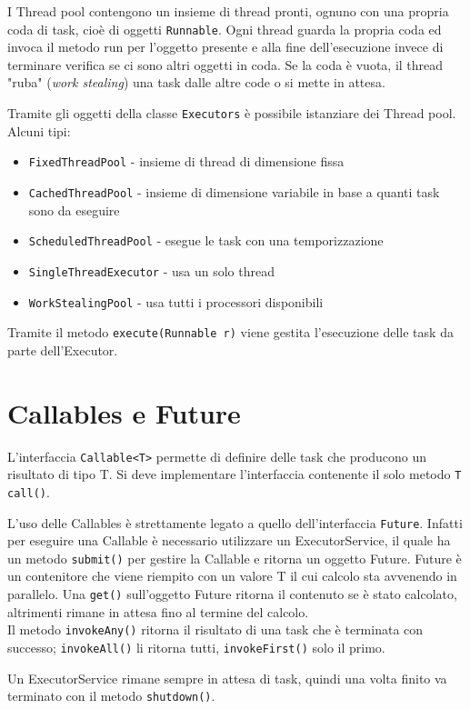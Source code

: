 I Thread pool contengono un insieme di thread pronti, ognuno con una propria coda di task, cioè di oggetti \texttt{Runnable}. Ogni thread guarda la propria coda ed invoca il metodo run per l'oggetto presente e alla fine dell'esecuzione invece di terminare verifica se ci sono altri oggetti in coda. Se la coda è vuota, il thread "ruba" (\textit{work stealing}) una task dalle altre code o si mette in attesa.

Tramite gli oggetti della classe \texttt{Executors} è possibile istanziare dei Thread pool. Alcuni tipi:
\begin{itemize}
\item \texttt{FixedThreadPool} - insieme di thread di dimensione fissa
\item \texttt{CachedThreadPool} - insieme di dimensione variabile in base a quanti task sono da eseguire
\item \texttt{ScheduledThreadPool} - esegue le task con una temporizzazione
\item \texttt{SingleThreadExecutor} - usa un solo thread
\item \texttt{WorkStealingPool} - usa tutti i processori disponibili
\end{itemize}
Tramite il metodo \texttt{execute(Runnable r)} viene gestita l'esecuzione delle task da parte dell'Executor.

\section{Callables e Future}
L'interfaccia \texttt{Callable<T>} permette di definire delle task che producono un risultato di tipo T. Si deve implementare l'interfaccia contenente il solo metodo \texttt{T call()}.

L'uso delle Callables è strettamente legato a quello dell'interfaccia \texttt{Future}. Infatti per eseguire una Callable è necessario utilizzare un ExecutorService, il quale ha un metodo \texttt{submit()} per gestire la Callable e ritorna un oggetto Future. Future è un contenitore che viene riempito con un valore T il cui calcolo sta avvenendo in parallelo. Una \texttt{get()} sull'oggetto Future ritorna il contenuto se è stato calcolato, altrimenti rimane in attesa fino al termine del calcolo. \\
Il metodo \texttt{invokeAny()} ritorna il risultato di una task che è terminata con successo; \texttt{invokeAll()} li ritorna tutti, \texttt{invokeFirst()} solo il primo.

Un ExecutorService rimane sempre in attesa di task, quindi una volta finito va terminato con il metodo \texttt{shutdown()}.
